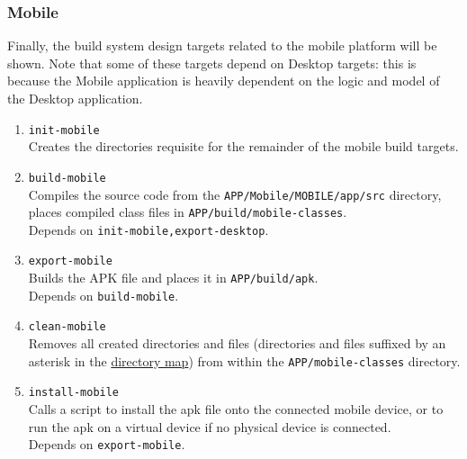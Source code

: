 \documentclass[12pt]{report}
\begin{document}
\subsubsection{Mobile}
Finally, the build system design targets related to the mobile platform will be shown. Note that
some of these targets depend on Desktop targets: this is because the Mobile application is heavily
dependent on the logic and model of the Desktop application.
\begin{enumerate}
	\item \texttt{init-mobile}\\
		Creates the directories requisite for the remainder of the mobile build targets.
	\item \texttt{build-mobile}\\
		Compiles the source code from the \texttt{APP/Mobile/MOBILE/app/src} directory, places
		compiled class files in \texttt{APP/build/mobile-classes}.\\
		Depends on \texttt{init-mobile,export-desktop}.
	\item \texttt{export-mobile}\\
		Builds the APK file and places it in \texttt{APP/build/apk}.\\
		Depends on \texttt{build-mobile}.
	\item \texttt{clean-mobile}\\
		Removes all created directories and files (directories and files suffixed by an asterisk in
		the \hyperref[s:build-dirtree]{directory map}) from within the \texttt{APP/mobile-classes}
		directory.
	\item \texttt{install-mobile}\\
		Calls a script to install the apk file onto the connected mobile device, or to run the apk
		on a virtual device if no physical device is connected.\\
		Depends on \texttt{export-mobile}.
\end{enumerate}
\end{document}
